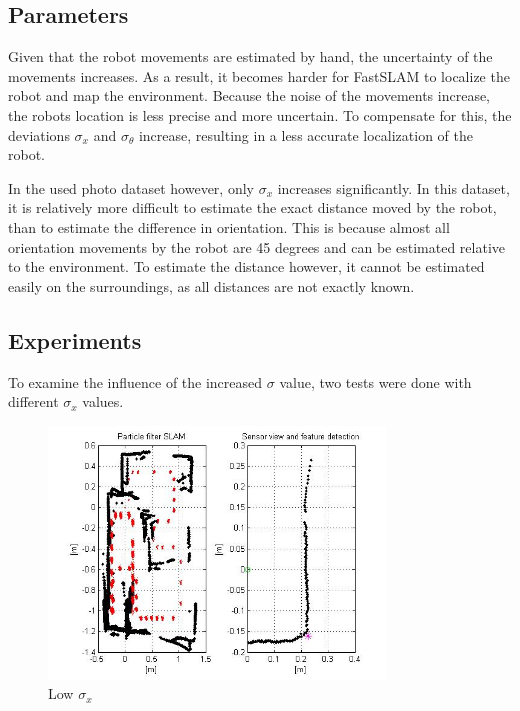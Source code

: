 \documentclass[12pt]{article}
\begin{document}
\subsection{Parameters}
Given that the robot movements are estimated by hand, the uncertainty of the movements increases. As a result, it becomes harder for FastSLAM to localize the robot and map the environment. Because the noise of the movements increase, the robots location is less precise and more uncertain. To compensate for this, the deviations $\sigma_x$ and $\sigma_\theta$ increase, resulting in a less accurate localization of the robot.

In the used photo dataset however, only $\sigma_x$ increases significantly. In this dataset, it is relatively more difficult to estimate the exact distance moved by the robot, than to estimate the difference in orientation. This is because almost all orientation movements by the robot are 45 degrees and can be estimated relative to the environment. To estimate the distance however, it cannot be estimated easily on the surroundings, as all distances are not exactly known.

\subsection{Experiments}
To examine the influence of the increased $\sigma$ value, two tests were done with different $\sigma_x$ values.

\begin{figure}[H]
	\centering
	\includegraphics[width=0.8\textwidth]{own_normal.jpg}
	\caption{Low $\sigma_x$}
\end{figure}
\end{document}
